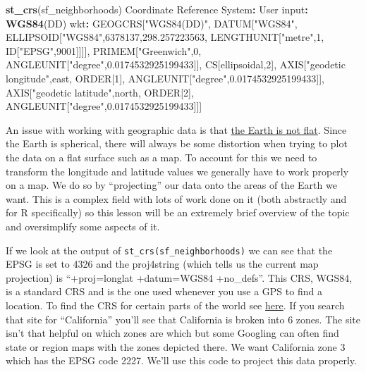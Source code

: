 \documentclass[
  12pt,
]{book}
\newenvironment{Shaded}{\begin{snugshade}}{\end{snugshade}}
\newcommand{\DecValTok}[1]{\textcolor[rgb]{0.00,0.00,0.81}{#1}}
\newcommand{\FloatTok}[1]{\textcolor[rgb]{0.00,0.00,0.81}{#1}}
\newcommand{\KeywordTok}[1]{\textcolor[rgb]{0.13,0.29,0.53}{\textbf{#1}}}
\newcommand{\NormalTok}[1]{#1}
\newcommand{\OperatorTok}[1]{\textcolor[rgb]{0.81,0.36,0.00}{\textbf{#1}}}
\newcommand{\StringTok}[1]{\textcolor[rgb]{0.31,0.60,0.02}{#1}}
\begin{document}
\begin{Shaded}
\begin{Highlighting}[]
\KeywordTok{st\_crs}\NormalTok{(sf\_neighborhoods)}
\NormalTok{Coordinate Reference System}\OperatorTok{:}
\StringTok{  }\NormalTok{User input}\OperatorTok{:}\StringTok{ }\KeywordTok{WGS84}\NormalTok{(DD) }
\NormalTok{  wkt}\OperatorTok{:}
\NormalTok{GEOGCRS[}\StringTok{"WGS84(DD)"}\NormalTok{,}
\NormalTok{    DATUM[}\StringTok{"WGS84"}\NormalTok{,}
\NormalTok{        ELLIPSOID[}\StringTok{"WGS84"}\NormalTok{,}\DecValTok{6378137}\NormalTok{,}\FloatTok{298.257223563}\NormalTok{,}
\NormalTok{            LENGTHUNIT[}\StringTok{"metre"}\NormalTok{,}\DecValTok{1}\NormalTok{,}
\NormalTok{                ID[}\StringTok{"EPSG"}\NormalTok{,}\DecValTok{9001}\NormalTok{]]]],}
\NormalTok{    PRIMEM[}\StringTok{"Greenwich"}\NormalTok{,}\DecValTok{0}\NormalTok{,}
\NormalTok{        ANGLEUNIT[}\StringTok{"degree"}\NormalTok{,}\FloatTok{0.0174532925199433}\NormalTok{]],}
\NormalTok{    CS[ellipsoidal,}\DecValTok{2}\NormalTok{],}
\NormalTok{        AXIS[}\StringTok{"geodetic longitude"}\NormalTok{,east,}
\NormalTok{            ORDER[}\DecValTok{1}\NormalTok{],}
\NormalTok{            ANGLEUNIT[}\StringTok{"degree"}\NormalTok{,}\FloatTok{0.0174532925199433}\NormalTok{]],}
\NormalTok{        AXIS[}\StringTok{"geodetic latitude"}\NormalTok{,north,}
\NormalTok{            ORDER[}\DecValTok{2}\NormalTok{],}
\NormalTok{            ANGLEUNIT[}\StringTok{"degree"}\NormalTok{,}\FloatTok{0.0174532925199433}\NormalTok{]]]}
\end{Highlighting}
\end{Shaded}

An issue with working with geographic data is that \href{https://en.wikipedia.org/wiki/Spherical_Earth}{the Earth is not flat}. Since the Earth is spherical, there will always be some distortion when trying to plot the data on a flat surface such as a map. To account for this we need to transform the longitude and latitude values we generally have to work properly on a map. We do so by ``projecting'' our data onto the areas of the Earth we want. This is a complex field with lots of work done on it (both abstractly and for R specifically) so this lesson will be an extremely brief overview of the topic and oversimplify some aspects of it.

If we look at the output of \texttt{st\_crs(sf\_neighborhoods)} we can see that the EPSG is set to 4326 and the proj4string (which tells us the current map projection) is ``+proj=longlat +datum=WGS84 +no\_defs''. This CRS, WGS84, is a standard CRS and is the one used whenever you use a GPS to find a location. To find the CRS for certain parts of the world see \href{https://spatialreference.org/}{here}. If you search that site for ``California'' you'll see that California is broken into 6 zones. The site isn't that helpful on which zones are which but some Googling can often find state or region maps with the zones depicted there. We want California zone 3 which has the EPSG code 2227. We'll use this code to project this data properly.
\end{document}
